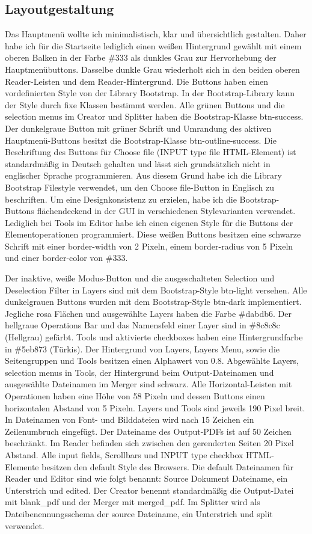 \subsection{Layoutgestaltung}
Das Hauptmenü wollte ich minimalistisch, klar und übersichtlich gestalten. Daher habe ich für die Startseite lediglich einen weißen Hintergrund gewählt mit einem oberen Balken in der Farbe \#333 als dunkles Grau zur Hervorhebung der Hauptmenübuttons. Dasselbe dunkle Grau wiederholt sich in den beiden oberen Reader-Leisten und dem Reader-Hintergrund. Die Buttons haben einen vordefinierten Style von der Library Bootstrap. In der Bootstrap-Library kann der Style durch fixe Klassen bestimmt werden. Alle grünen Buttons und die selection menus im Creator und Splitter haben die Bootstrap-Klasse btn-success. Der dunkelgraue Button mit grüner Schrift und Umrandung des aktiven Hauptmenü-Buttons besitzt die Bootstrap-Klasse btn-outline-success. Die Beschriftung des Buttons für Choose file (INPUT type file HTML-Element) ist standardmäßig in Deutsch gehalten und lässt sich grundsätzlich nicht in englischer Sprache programmieren. Aus diesem Grund habe ich die Library Bootstrap Filestyle verwendet, um den Choose file-Button in Englisch zu beschriften. Um eine Designkonsistenz zu erzielen, habe ich die Bootstrap-Buttons flächendeckend in der GUI in verschiedenen Stylevarianten verwendet. Lediglich bei Tools im Editor habe ich einen eigenen Style für die Buttons der Elementoperationen programmiert. Diese weißen Buttons besitzen eine schwarze Schrift mit einer border-width von 2 Pixeln, einem border-radius von 5 Pixeln und einer border-color von \#333. 
\par
Der inaktive, weiße Modus-Button und die ausgeschalteten Selection und Deselection Filter in Layers sind mit dem Bootstrap-Style btn-light versehen. Alle dunkelgrauen Buttons wurden mit dem Bootstrap-Style btn-dark implementiert. Jegliche rosa Flächen und ausgewählte Layers haben die Farbe \#dabdb6. Der hellgraue Operations Bar und das Namensfeld einer Layer sind in \#8c8c8c (Hellgrau) gefärbt. Tools und aktivierte checkboxes haben eine Hintergrundfarbe in \#5eb873 (Türkis). Der Hintergrund von Layers, Layers Menu, sowie die Seitengruppen und Tools besitzen einen Alphawert von 0.8. Abgewählte Layers, selection menus in Tools, der Hintergrund beim Output-Dateinamen und ausgewählte Dateinamen im Merger sind schwarz. Alle Horizontal-Leisten mit Operationen haben eine Höhe von 58 Pixeln und dessen Buttons einen horizontalen Abstand von 5 Pixeln. Layers und Tools sind jeweils 190 Pixel breit. In Dateinamen von Font- und Bilddateien wird nach 15 Zeichen ein Zeilenumbruch eingefügt. Der Dateiname des Output-PDFs ist auf 50 Zeichen beschränkt. Im Reader befinden sich zwischen den gerenderten Seiten 20 Pixel Abstand. Alle input fields, Scrollbars und INPUT type checkbox HTML-Elemente besitzen den default Style des Browsers. Die default Dateinamen für Reader und Editor sind wie folgt benannt: Source Dokument Dateiname, ein Unterstrich und edited. Der Creator benennt standardmäßig die Output-Datei mit blank\_pdf und der Merger mit merged\_pdf. Im Splitter wird als Dateibenennungsschema der source Dateiname, ein Unterstrich und split verwendet. 

